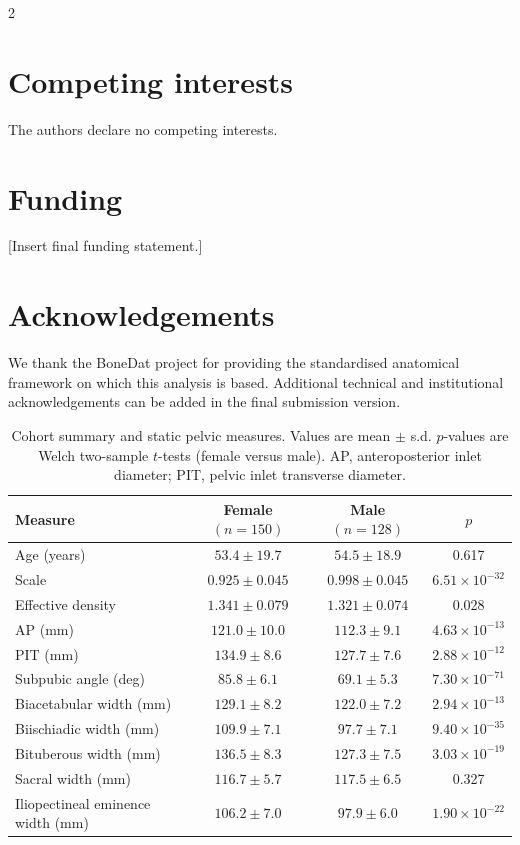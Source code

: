 \documentclass[openacc]{rsproca_new}
\begin{document}
\begin{multicols}{2}
\section*{Competing interests}

The authors declare no competing interests.

\section*{Funding}

[Insert final funding statement.]

\section*{Acknowledgements}

We thank the BoneDat project for providing the standardised anatomical framework on which this analysis is based. Additional technical and institutional acknowledgements can be added in the final submission version.

\end{multicols}

\begin{table}[p]
\centering
\caption{Cohort summary and static pelvic measures. Values are mean $\pm$ s.d. $p$-values are Welch two-sample $t$-tests (female versus male). AP, anteroposterior inlet diameter; PIT, pelvic inlet transverse diameter.}
\label{tab:cohort}
\begin{tabular}{lccc}
\toprule
Measure & Female $(n=150)$ & Male $(n=128)$ & $p$ \\
\midrule
Age (years) & $53.4 \pm 19.7$ & $54.5 \pm 18.9$ & 0.617 \\
Scale & $0.925 \pm 0.045$ & $0.998 \pm 0.045$ & $6.51 \times 10^{-32}$ \\
Effective density & $1.341 \pm 0.079$ & $1.321 \pm 0.074$ & 0.028 \\
AP (mm) & $121.0 \pm 10.0$ & $112.3 \pm 9.1$ & $4.63 \times 10^{-13}$ \\
PIT (mm) & $134.9 \pm 8.6$ & $127.7 \pm 7.6$ & $2.88 \times 10^{-12}$ \\
Subpubic angle (deg) & $85.8 \pm 6.1$ & $69.1 \pm 5.3$ & $7.30 \times 10^{-71}$ \\
Biacetabular width (mm) & $129.1 \pm 8.2$ & $122.0 \pm 7.2$ & $2.94 \times 10^{-13}$ \\
Biischiadic width (mm) & $109.9 \pm 7.1$ & $97.7 \pm 7.1$ & $9.40 \times 10^{-35}$ \\
Bituberous width (mm) & $136.5 \pm 8.3$ & $127.3 \pm 7.5$ & $3.03 \times 10^{-19}$ \\
Sacral width (mm) & $116.7 \pm 5.7$ & $117.5 \pm 6.5$ & 0.327 \\
Iliopectineal eminence width (mm) & $106.2 \pm 7.0$ & $97.9 \pm 6.0$ & $1.90 \times 10^{-22}$ \\
\bottomrule
\end{tabular}
\end{table}
\end{document}

